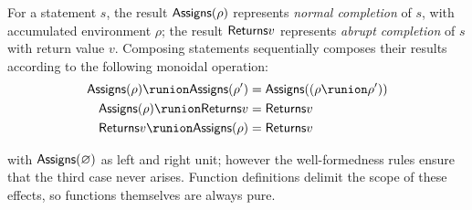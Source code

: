 \documentclass{scrartcl}
\begin{document}
For a statement $s$, the result $\mathsf{Assigns}(\rho)$ represents \emph{normal completion} of $s$, with accumulated
environment $\rho$; the result $\mathsf{Returns}{v}$ represents \emph{abrupt completion} of $s$ with return value $v$.
Composing statements sequentially composes their results according to the following monoidal operation:
{\small
\begin{align*}
\Assigns{\rho} \runion \Assigns{\rho'} & = \Assigns{(\rho \runion \rho')} \\
\Assigns{\rho} \runion \Returns{v} & = \Returns{v} \\
\Returns{v} \runion \Assigns{\rho} & = \Returns{v}
\end{align*}}

\noindent with $\mathsf{Assigns}(\varnothing)$ as left and right unit; however the well-formedness rules ensure that
the third case never arises. Function definitions delimit the scope of these effects, so functions themselves
are always pure.


\end{document}
